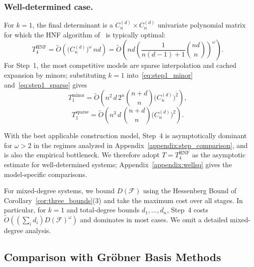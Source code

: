 \subsubsection{Well-determined case.}
For $k=1$, the final determinant is a $C_n^{(d)}\times C_n^{(d)}$ univariate polynomial matrix for which the HNF algorithm of~\cite{DBLP:journals/jc/LabahnNZ17} is typically optimal:
\begin{equation}
	T_{4}^{\mathrm{HNF}} = \widetilde{O}\!\left(\bigl(C_n^{(d)}\bigr)^{\omega}\,nd\right)
	= \widetilde{O}\!\left(nd\left(\frac{1}{n(d-1)+1}\binom{nd}{n}\right)^{\omega}\right).
	\label{eq:dixon_complexity_well}
\end{equation}
For Step~1, the most competitive models are sparse interpolation and cached expansion by minors; substituting $k=1$ into~\eqref{eq:step1_minor} and~\eqref{eq:step1_sparse} gives
\begin{equation}
	T_{1}^{\mathrm{minor}} = \widetilde{O}\!\left(n^2\,d\,2^n\binom{n+d}{n}\bigl(C_n^{(d)}\bigr)^2\right),
	\label{eq:dixon_complexity_well_step1_minor}
\end{equation}
\begin{equation}
	T_{1}^{\mathrm{sparse}} = \widetilde{O}\!\left(n^3\,d\,\binom{n+d}{n}\bigl(C_n^{(d)}\bigr)^2\right).
	\label{eq:dixon_complexity_well_step1_sparse}
\end{equation}

With the best applicable construction model, Step~4 is asymptotically dominant for $\omega>2$ in the regimes analyzed in Appendix~\ref{appendix:step_comparison}, and is also the empirical bottleneck. We therefore adopt $T=T_{4}^{\mathrm{HNF}}$ as the asymptotic estimate for well-determined systems; Appendix~\ref{appendix:wellsq} gives the model-specific comparisons.

\begin{remark}\label{rem:mixed_degree_complexity}
For mixed-degree systems, we bound $D(\mathcal F)$
using the Hessenberg Bound of Corollary~\ref{cor:three_bounds}(3)
and take the maximum cost over all stages.
In particular, for $k=1$ and total-degree bounds $d_1,\ldots,d_n$,
Step~4 costs $\widetilde{O}((\sum_i d_i)D(\mathcal F)^\omega)$
and dominates in most cases.
We omit a detailed mixed-degree analysis.
\end{remark}

\subsection{Comparison with Gr\"obner Basis Methods}\label{Subsection:Other_Comparison}

